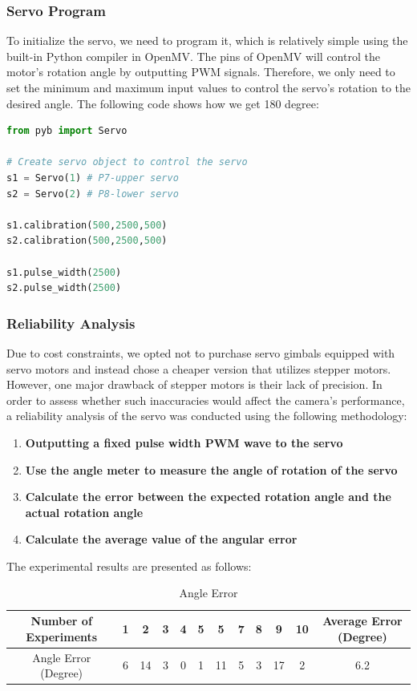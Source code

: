 \documentclass[12pt, a4paper, oneside]{report}
\begin{document}
 \subsubsection*{Servo Program}
To initialize the servo, we need to program it, which is relatively simple using the built-in Python compiler in OpenMV. The pins of OpenMV will control the motor's rotation angle by outputting PWM signals. Therefore, we only need to set the minimum and maximum input values to control the servo's rotation to the desired angle. The following code shows how we get 180 degree:

\begin{lstlisting}[language=Python]
from pyb import Servo

# Create servo object to control the servo
s1 = Servo(1) # P7-upper servo
s2 = Servo(2) # P8-lower servo

s1.calibration(500,2500,500)
s2.calibration(500,2500,500)

s1.pulse_width(2500)
s2.pulse_width(2500)	
\end{lstlisting}

 \subsubsection*{Reliability Analysis}
 Due to cost constraints, we opted not to purchase servo gimbals equipped with servo motors and instead chose a cheaper version that utilizes stepper motors. However, one major drawback of stepper motors is their lack of precision. In order to assess whether such inaccuracies would affect the camera's performance, a reliability analysis of the servo was conducted using the following methodology:
  \begin{enumerate}

\item \textbf{Outputting a fixed pulse width PWM wave to the servo}
\item \textbf{Use the angle meter to measure the angle of rotation of the servo}
\item \textbf{Calculate the error between the expected rotation angle and the actual rotation angle}
\item \textbf{Calculate the average value of the angular error}
\end{enumerate}
The experimental results are presented as follows:


\begin{table}[H]
    \centering
\begin{tabular}{|*{12}{c|}}

  \hline
  Number of Experiments & 1 & 2 & 3 & 4 & 5 & 5 & 7 & 8 & 9 & 10 & Average Error (Degree)\\
  \hline
  Angle Error (Degree)& 6 & 14 & 3 & 0 & 1 & 11 & 5 & 3 & 17 & 2 &6.2\\
  \hline
  
\end{tabular}
    \caption{Angle Error}
    \label{tab:reliability}
\end{table}
\end{document}
